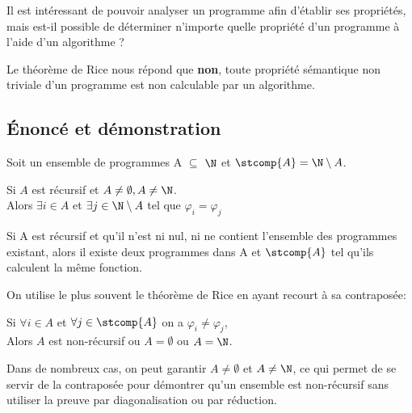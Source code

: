 Il est intéressant de pouvoir analyser un programme afin d'établir ses propriétés, mais est-il possible de déterminer n'importe quelle propriété d'un programme à l'aide d'un algorithme ?

Le théorème de Rice nous répond que \textbf{non}, toute propriété sémantique non triviale d'un programme est non calculable par un algorithme.

\subsection{Énoncé et démonstration}

Soit un ensemble de programmes A $\subseteq$ $\N$ et $\stcomp{A} = \N \setminus A$.

\begin{mytheo}[Rice]
	Si $A$ est récursif et $A\neq \emptyset, A \neq \N$. \\
	Alors $\exists i \in A$ et $\exists j \in \N \setminus A$ tel que $\varphi _i = \varphi _j$

	Si A est récursif et qu'il n'est ni nul, ni ne contient l'ensemble des programmes existant, alors il existe deux programmes dans A et $\stcomp{A}$ tel qu'ils calculent la même fonction.
\end{mytheo}

On utilise le plus souvent le théorème de Rice en ayant recourt à sa contraposée:

\begin{mytheo}
	Si $\forall  i \in A$ et $\forall j \in \stcomp{A}$ on a $\varphi_i \neq \varphi_j$, \\
	Alors $A$ est non-récursif ou $A = \emptyset$ ou $A = \N$.
\end{mytheo}

Dans de nombreux cas, on peut garantir $A \neq \emptyset$ et $A \neq \N$, ce qui permet de se servir de la contraposée pour démontrer qu'un ensemble est non-récursif sans utiliser la preuve par diagonalisation ou par réduction.


